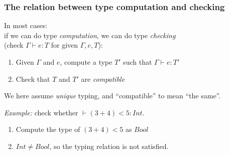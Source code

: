 \documentclass{beamer}
\begin{document}
\begin{frame}[fragile]\frametitle{The relation between type computation and checking}

  In most cases:\\
  if we can do type \emph{computation}, we can do type \emph{checking}\\
  (check $\Gamma \vdash e : T$ for given $\Gamma, e, T$):

  \begin{enumerate}
  \item  Given $\Gamma$ and $e$, compute a type $T'$ such that $\Gamma
    \vdash e : T'$
  \item Check that $T$ and $T'$ are \emph{compatible} 
  \end{enumerate}

  We here assume \emph{unique} typing, and ``compatible'' to mean ``the same''.

  \vspace{4mm}
  \emph{Example:} check whether $\vdash (3 + 4) < 5 : Int$.
  \begin{enumerate}
  \item Compute the type of $(3 + 4) < 5$ as $Bool$
  \item $Int \neq Bool$, so the typing relation is not satisfied.
  \end{enumerate}
  
\end{frame}
\end{document}
